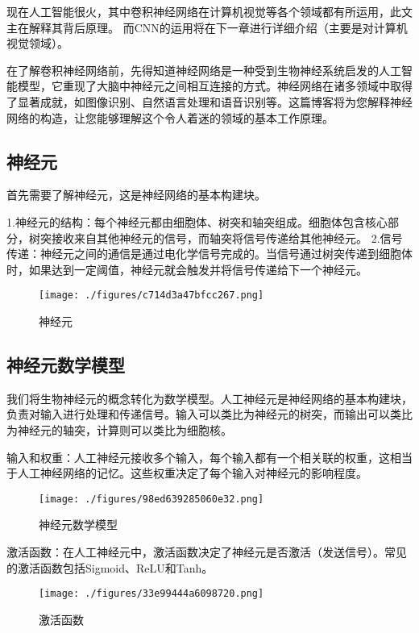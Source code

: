 现在人工智能很火，其中卷积神经网络在计算机视觉等各个领域都有所运用，此文主在解释其背后原理。
而CNN的运用将在下一章进行详细介绍（主要是对计算机视觉领域）。

在了解卷积神经网络前，先得知道神经网络是一种受到生物神经系统启发的人工智能模型，它重现了大脑中神经元之间相互连接的方式。神经网络在诸多领域中取得了显著成就，如图像识别、自然语言处理和语音识别等。这篇博客将为您解释神经网络的构造，让您能够理解这个令人着迷的领域的基本工作原理。
\subsection{神经元}\label{sub_CNN1_1}
首先需要了解神经元，这是神经网络的基本构建块。

1.神经元的结构：每个神经元都由细胞体、树突和轴突组成。细胞体包含核心部分，树突接收来自其他神经元的信号，而轴突将信号传递给其他神经元。
2.信号传递：神经元之间的通信是通过电化学信号完成的。当信号通过树突传递到细胞体时，如果达到一定阈值，神经元就会触发并将信号传递给下一个神经元。
\begin{figure}[ht]
\centering
\texttt{[image: ./figures/c714d3a47bfcc267.png]}
\caption{神经元} \label{fig_CNN1_1}
\end{figure}

\subsection{神经元数学模型 }
我们将生物神经元的概念转化为数学模型。人工神经元是神经网络的基本构建块，负责对输入进行处理和传递信号。输入可以类比为神经元的树突，而输出可以类比为神经元的轴突，计算则可以类比为细胞核。

输入和权重：人工神经元接收多个输入，每个输入都有一个相关联的权重，这相当于人工神经网络的记忆。这些权重决定了每个输入对神经元的影响程度。\begin{figure}[ht]
\centering
\texttt{[image: ./figures/98ed639285060e32.png]}
\caption{神经元数学模型} \label{fig_CNN1_2}
\end{figure}
激活函数：在人工神经元中，激活函数决定了神经元是否激活（发送信号）。常见的激活函数包括Sigmoid、ReLU和Tanh。
\begin{figure}[ht]
\centering
\texttt{[image: ./figures/33e99444a6098720.png]}
\caption{激活函数} \label{fig_CNN1_3}
\end{figure}

